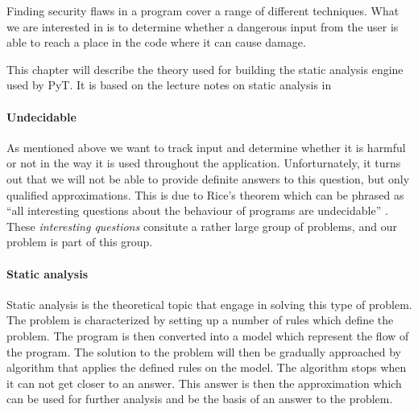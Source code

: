 Finding security flaws in a program cover a range of different techniques.
What we are interested in is to determine whether a dangerous input from the user is able to reach a place in the code where it can cause damage.

This chapter will describe the theory used for building the static analysis engine used by PyT.
It is based on the lecture notes on static analysis in \citet{schwartzbach}


\paragraph{Undecidable}\label{theory_intro}
As mentioned above we want to track input and determine whether it is harmful or not in the way it is used throughout the application.
Unforturnately, it turns out that we will not be able to provide definite answers to this question, but only qualified approximations.
This is due to Rice's theorem which can be phrased as ``all interesting questions about the behaviour of programs are undecidable'' \citep[p.~3]{schwartzbach}.
These \emph{interesting questions} consitute a rather large group of problems, and our problem is part of this group.

\paragraph{Static analysis}
Static analysis is the theoretical topic that engage in solving this type of problem.
The problem is characterized by setting up a number of rules which define the problem.
The program is then converted into a model which represent the flow of the program.
The solution to the problem will then be gradually approached by algorithm that applies the defined rules on the model.
The algorithm stops when it can not get closer to an answer.
This answer is then the approximation which can be used for further analysis and be the basis of an answer to the problem.

